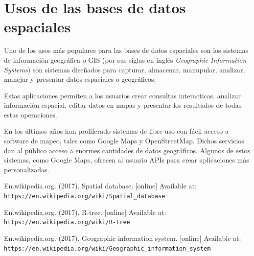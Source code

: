 \documentclass{article}
\begin{document}
\section{Usos de las bases de datos espaciales}
Uno de los usos m\'as populares para las bases de datos espaciales son los sistemas de informaci\'on geogr\'afica o GIS (por sus siglas en ingl\'es \emph{Geographic Information Systems}) son sistemas dise\~nados para capturar, almacenar, manupular, analizar, manejar y presentar datos espaciales o geogr\'aficos.

Estas aplicaciones permiten a los usuarios crear consultas interacticas, analizar informaci\'on espacial, editar datos en mapas y presentar los resultados de todas estas operaciones.

En los \'ultimos a\~nos han proliferado sistemas de libre uso con f\'acil acceso a software de mapeo, tales como Google Maps y OpenStreetMap. Dichos servicios dan al p\'ublico acceso a enormes cantidades de datos geogr\'aficos. Algunos de estos sistemas, como Google Maps, ofrecen al usuario APIs para crear aplicaciones m\'as personalizadas.

\begin{thebibliography}{99}
  En.wikipedia.org. (2017). Spatial database. [online] Available at: \texttt{https://en.wikipedia.org/wiki/Spatial\_database}

 En.wikipedia.org. (2017). R-tree. [online] Available at: \texttt{https://en.wikipedia.org/wiki/R-tree}

 En.wikipedia.org. (2017). Geographic information system. [online] Available at: \texttt{https://en.wikipedia.org/wiki/Geographic\_information\_system}

\end{thebibliography}
\end{document}
